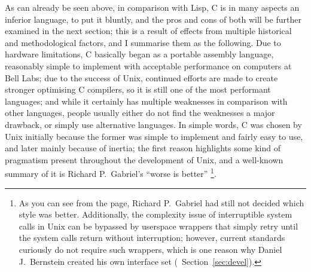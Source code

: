 As can already be seen above, in comparison with Lisp, C is in many aspects an
inferior language, to put it bluntly, and the pros and
cons of both will be further examined in the next section; this is a result of
effects from multiple historical and methodological factors, and I summarise
them as the following.  Due to hardware limitations, C basically began as a
portable assembly language, reasonably simple to implement with acceptable
performance on computers at Bell Labs; due to the success of Unix, continued
efforts are made to create stronger optimising C compilers, so it is still one
of the most performant languages; and while it certainly has multiple weaknesses
in comparison with other languages, people usually either do not find the
weaknesses a major drawback, or simply use alternative languages.  In simple
words, C was chosen by Unix initially because the former was simple to implement
and fairly easy to use, and later mainly because of inertia; the first reason
highlights some kind of pragmatism present throughout the development of Unix,
and a well-known summary of it is Richard P.\ Gabriel's ``worse is better''%
\footnote{As you can see from the page, Richard
P.\ Gabriel had still not decided which style was better.  Additionally,
the complexity issue of interruptible system calls in Unix can be bypassed
by userspace wrappers that simply retry until the system calls return without
interruption; however, current standards curiously do not require such
wrappers, which is one reason why Daniel J.\ Bernstein created
his own interface set (\cf~Section~\ref{sec:devel}).}.


